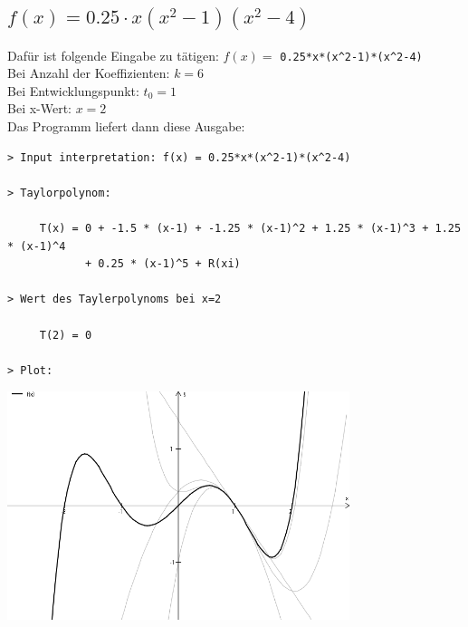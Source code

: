 \documentclass{scrartcl}
\begin{document}
	\subsection{$f(x)=0.25\cdot x(x^2-1)(x^2-4)$}
Dafür ist folgende Eingabe zu tätigen: $f(x)=$ \texttt{0.25*x*(x\^{ }2-1)*(x\^{ }2-4)} \\
Bei Anzahl der Koeffizienten: $k=6$\\
Bei Entwicklungspunkt: $t_0=1$\\
Bei x-Wert: $x=2$\\
Das Programm liefert dann diese Ausgabe:
\begin{verbatim}
> Input interpretation: f(x) = 0.25*x*(x^2-1)*(x^2-4)
 
> Taylorpolynom: 

     T(x) = 0 + -1.5 * (x-1) + -1.25 * (x-1)^2 + 1.25 * (x-1)^3 + 1.25 * (x-1)^4
            + 0.25 * (x-1)^5 + R(xi)

> Wert des Taylerpolynoms bei x=2

     T(2) = 0

> Plot:
\end{verbatim}
\begin{center}
\includegraphics[width=10cm]{./png/plot_ploynom.png}
\end{center}
\newpage
\end{document}
